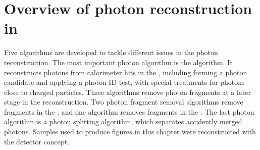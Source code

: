 
\section{Overview of photon reconstruction in \pandora}



Five algorithms are developed to tackle different issues in the photon reconstruction. The most important photon algorithm is the \PhotonReconstruction algorithm. It reconstructs photons from calorimeter hits in the \ECAL, including forming a photon candidate and applying a photon ID test, with special treatments for photons close to charged particles. Three algorithms remove photon fragments at a later stage in the reconstruction. Two photon fragment removal algorithms remove fragments in the \ECAL, and one algorithm removes fragments in the \HCAL. The last photon algorithm is a photon splitting algorithm, which separates accidently merged photons. Samples used to produce figures in this chapter were reconstructed with the \ILD detector concept.




